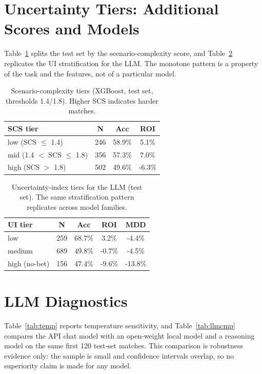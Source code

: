 \documentclass[10pt]{article}
\begin{document}
\section{Uncertainty Tiers: Additional Scores and Models}
\label{app:unc}
Table~\ref{tab:scs} splits the test set by the scenario-complexity score, and
Table~\ref{tab:uillm} replicates the UI stratification for the LLM. The
monotone pattern is a property of the task and the features, not of a
particular model.

\begin{table}[H]
\centering
\caption{Scenario-complexity tiers (XGBoost, test set, thresholds 1.4/1.8).
Higher SCS indicates harder matches.}
\label{tab:scs}
\small
\begin{tabular}{lccc}
\toprule
SCS tier & N & Acc & ROI \\
\midrule
low (SCS $\le$ 1.4) & 246 & 58.9\% & 5.1\% \\
mid (1.4 $<$ SCS $\le$ 1.8) & 356 & 57.3\% & 7.0\% \\
high (SCS $>$ 1.8) & 502 & 49.6\% & -6.3\% \\
\bottomrule
\end{tabular}
\end{table}

\begin{table}[H]
\centering
\caption{Uncertainty-index tiers for the LLM (test set). The same
stratification pattern replicates across model families.}
\label{tab:uillm}
\small
\begin{tabular}{lcccc}
\toprule
UI tier & N & Acc & ROI & MDD \\
\midrule
low & 259 & 68.7\% & 3.2\% & -4.4\% \\
medium & 689 & 49.8\% & -0.7\% & -4.5\% \\
high (no-bet) & 156 & 47.4\% & -9.6\% & -13.8\% \\
\bottomrule
\end{tabular}
\end{table}

\section{LLM Diagnostics}
\label{app:llm}
Table~\ref{tab:temp} reports temperature sensitivity, and
Table~\ref{tab:llmcmp} compares the API chat model with an open-weight local
model and a reasoning model on the same first 120 test-set matches. This
comparison is robustness evidence only: the sample is small and confidence
intervals overlap, so no superiority claim is made for any model.
\end{document}
